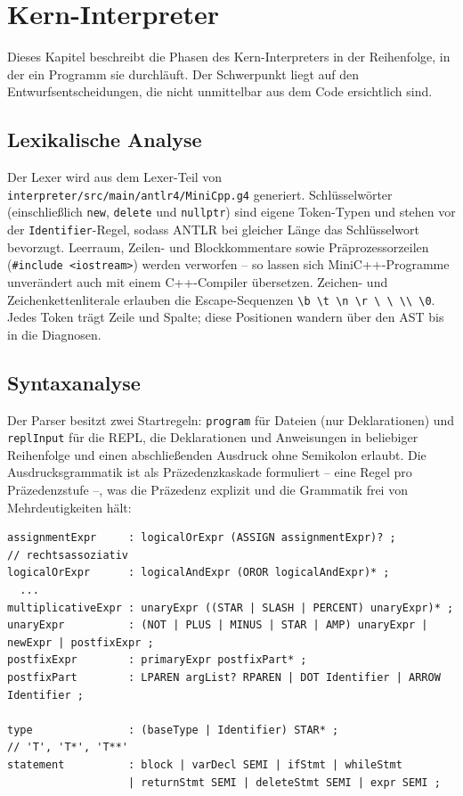 \documentclass[11pt,a4paper,parskip=half,headsepline,toc=flat]{scrartcl}
\newcommand{\code}[1]{\texttt{#1}}
\newcommand{\bs}{\textbackslash}
\newcommand{\dquote}{\textquotedbl}
\newcommand{\sq}{\textquotesingle}
\begin{document}
\section{Kern-Interpreter}\label{sec:kern}
Dieses Kapitel beschreibt die Phasen des Kern-Interpreters in der Reihenfolge, in der ein Programm sie durchläuft.
Der Schwerpunkt liegt auf den Entwurfsentscheidungen, die nicht unmittelbar aus dem Code ersichtlich sind.

\subsection{Lexikalische Analyse}
Der Lexer wird aus dem Lexer-Teil von \code{interpreter/src/main/antlr4/MiniCpp.g4} generiert. Schlüsselwörter
(einschließlich \code{new}, \code{delete} und \code{nullptr}) sind eigene Token-Typen und stehen vor der
\code{Identifier}-Regel, sodass ANTLR bei gleicher Länge das Schlüsselwort bevorzugt. Leerraum, Zeilen- und
Blockkommentare sowie Präprozessorzeilen (\code{\#include <iostream>}) werden verworfen -- so lassen sich
MiniC++-Programme unverändert auch mit einem C++-Compiler übersetzen. Zeichen- und Zeichenkettenliterale erlauben die
Escape-Sequenzen \code{\bs b \bs t \bs n \bs r \bs\dquote{} \bs\sq{} \bs\bs{} \bs 0}. Jedes Token trägt Zeile und Spalte;
diese Positionen wandern über den AST bis in die Diagnosen.

\subsection{Syntaxanalyse}
Der Parser besitzt zwei Startregeln: \code{program} für Dateien (nur Deklarationen) und \code{replInput} für die
REPL, die Deklarationen und Anweisungen in beliebiger Reihenfolge und einen abschließenden Ausdruck ohne Semikolon
erlaubt. Die Ausdrucksgrammatik ist als Präzedenzkaskade formuliert -- eine Regel pro Präzedenzstufe --, was die
Präzedenz explizit und die Grammatik frei von Mehrdeutigkeiten hält:

\begin{lstlisting}[caption={Auszug aus der Parser-Grammatik}]
assignmentExpr     : logicalOrExpr (ASSIGN assignmentExpr)? ;        // rechtsassoziativ
logicalOrExpr      : logicalAndExpr (OROR logicalAndExpr)* ;
  ...
multiplicativeExpr : unaryExpr ((STAR | SLASH | PERCENT) unaryExpr)* ;
unaryExpr          : (NOT | PLUS | MINUS | STAR | AMP) unaryExpr | newExpr | postfixExpr ;
postfixExpr        : primaryExpr postfixPart* ;
postfixPart        : LPAREN argList? RPAREN | DOT Identifier | ARROW Identifier ;

type               : (baseType | Identifier) STAR* ;                 // 'T', 'T*', 'T**'
statement          : block | varDecl SEMI | ifStmt | whileStmt
                   | returnStmt SEMI | deleteStmt SEMI | expr SEMI ;
\end{lstlisting}
\end{document}
